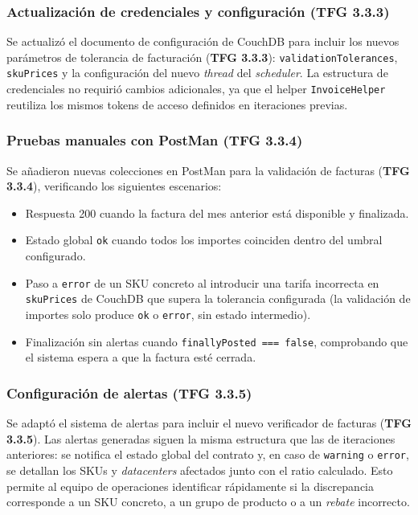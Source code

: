 \subsubsection{Actualización de credenciales y configuración (TFG 3.3.3)}

Se actualizó el documento de configuración de CouchDB para incluir los nuevos parámetros de tolerancia de facturación (\textbf{TFG 3.3.3}): \texttt{validationTolerances}, \texttt{skuPrices} y la configuración del nuevo \textit{thread} del \textit{scheduler}. La estructura de credenciales no requirió cambios adicionales, ya que el helper \texttt{InvoiceHelper} reutiliza los mismos tokens de acceso definidos en iteraciones previas.

\subsubsection{Pruebas manuales con PostMan (TFG 3.3.4)}

Se añadieron nuevas colecciones en PostMan para la validación de facturas (\textbf{TFG 3.3.4}), verificando los siguientes escenarios:

\begin{itemize}
    \item Respuesta 200 cuando la factura del mes anterior está disponible y finalizada.
    \item Estado global \texttt{ok} cuando todos los importes coinciden dentro del umbral configurado.
    \item Paso a \texttt{error} de un SKU concreto al introducir una tarifa incorrecta en \texttt{skuPrices} de CouchDB que supera la tolerancia configurada (la validación de importes solo produce \texttt{ok} o \texttt{error}, sin estado intermedio).
    \item Finalización sin alertas cuando \texttt{finallyPosted === false}, comprobando que el sistema espera a que la factura esté cerrada.
\end{itemize}

\subsubsection{Configuración de alertas (TFG 3.3.5)}

Se adaptó el sistema de alertas para incluir el nuevo verificador de facturas (\textbf{TFG 3.3.5}). Las alertas generadas siguen la misma estructura que las de iteraciones anteriores: se notifica el estado global del contrato y, en caso de \texttt{warning} o \texttt{error}, se detallan los SKUs y \textit{datacenters} afectados junto con el ratio calculado. Esto permite al equipo de operaciones identificar rápidamente si la discrepancia corresponde a un SKU concreto, a un grupo de producto o a un \textit{rebate} incorrecto.

